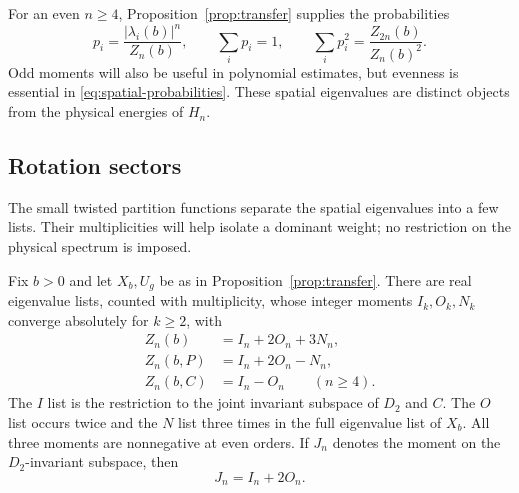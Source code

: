 For an even $n\ge4$, Proposition~\ref{prop:transfer} supplies the
probabilities
\begin{equation}\label{eq:spatial-probabilities}
 p_i=\frac{|\lambda_i(b)|^n}{Z_n(b)},\qquad
 \sum_i p_i=1,\qquad
 \sum_i p_i^2=\frac{Z_{2n}(b)}{Z_n(b)^2}.
\end{equation}
Odd moments will also be useful in polynomial estimates, but evenness is
essential in \eqref{eq:spatial-probabilities}. These spatial eigenvalues
are distinct objects from the physical energies of $H_n$.

\subsection{Rotation sectors}

The small twisted partition functions separate the spatial eigenvalues
into a few lists. Their multiplicities will help isolate a dominant
weight; no restriction on the physical spectrum is imposed.

\begin{lemma}\label{lem:sectors}
Fix $b>0$ and let $X_b,U_g$ be as in Proposition~\ref{prop:transfer}.
There are real eigenvalue lists, counted with multiplicity, whose
integer moments $I_k,O_k,N_k$ converge absolutely for $k\ge2$, with
\begin{align}
 Z_n(b)&=I_n+2O_n+3N_n,\label{eq:sector-total}\\
 Z_n(b,P)&=I_n+2O_n-N_n,\label{eq:sector-pi}\\
 Z_n(b,C)&=I_n-O_n\qquad(n\ge4).\label{eq:sector-cyclic}
\end{align}
The $I$ list is the restriction to the joint invariant subspace of
$D_2$ and $C$. The $O$ list occurs twice and the $N$ list three times
in the full eigenvalue list of $X_b$. All three moments are nonnegative
at even orders. If $J_n$ denotes the moment on the $D_2$-invariant
subspace, then
\[
 J_n=I_n+2O_n.
\]
\end{lemma}

